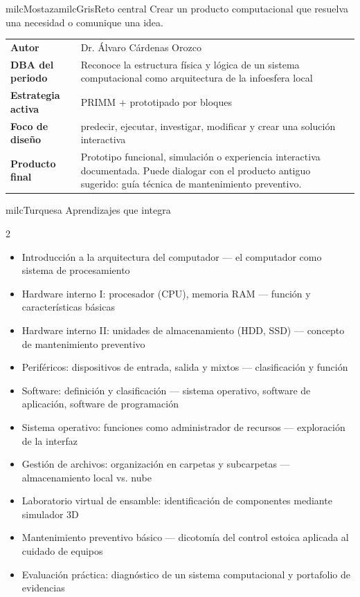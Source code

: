 \documentclass[11pt,letterpaper]{article}
\begin{document}
\begin{softbox}{milcMostaza}{milcGris}{Reto central}
Crear un producto computacional que resuelva una necesidad o comunique una idea.
\end{softbox}

\begin{tabularx}{\textwidth}{>{\bfseries}p{3.4cm}X}
\rowcolor{milcMagenta!12}Autor & Dr. Álvaro Cárdenas Orozco\\
DBA del periodo & Reconoce la estructura física y lógica de un sistema computacional como arquitectura de la infoesfera local\\
Estrategia activa & PRIMM + prototipado por bloques\\
Foco de diseño & predecir, ejecutar, investigar, modificar y crear una solución interactiva\\
Producto final & Prototipo funcional, simulación o experiencia interactiva documentada. Puede dialogar con el producto antiguo sugerido: guía técnica de mantenimiento preventivo.\\
\end{tabularx}

\begin{titlebox}{milcTurquesa}
Aprendizajes que integra
\end{titlebox}
\begin{multicols}{2}
\begin{itemize}[leftmargin=*]
\item Introducción a la arquitectura del computador — el computador como sistema de procesamiento
\item Hardware interno I: procesador (CPU), memoria RAM — función y características básicas
\item Hardware interno II: unidades de almacenamiento (HDD, SSD) — concepto de mantenimiento preventivo
\item Periféricos: dispositivos de entrada, salida y mixtos — clasificación y función
\item Software: definición y clasificación — sistema operativo, software de aplicación, software de programación
\item Sistema operativo: funciones como administrador de recursos — exploración de la interfaz
\item Gestión de archivos: organización en carpetas y subcarpetas — almacenamiento local vs. nube
\item Laboratorio virtual de ensamble: identificación de componentes mediante simulador 3D
\item Mantenimiento preventivo básico — dicotomía del control estoica aplicada al cuidado de equipos
\item Evaluación práctica: diagnóstico de un sistema computacional y portafolio de evidencias
\end{itemize}
\end{multicols}
\end{document}
